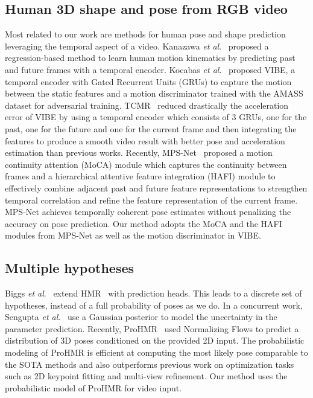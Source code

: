 \documentclass[runningheads]{llncs}
\newcommand{\etal}{\textit{et al}.}
\begin{document}
\subsection{Human 3D shape and pose from RGB video}
Most related to our work are methods for human pose and shape prediction leveraging the temporal aspect of a video. Kanazawa \etal~\cite{humanMotionKanazawa19} proposed a regression-based method to learn human motion kinematics by predicting past and future frames with a temporal encoder.
Kocabas \etal~\cite{kocabas2019vibe} proposed VIBE, a temporal encoder with Gated Recurrent Units (GRUs) to capture the motion between the static features and a motion discriminator trained with the AMASS~\cite{AMASS:ICCV:2019} dataset for adversarial training. TCMR~\cite{choi2020beyond} reduced drastically the acceleration error of VIBE by using a temporal encoder which consists of 3 GRUs,  one for the past, one for the future and one for the current frame and then integrating the features to produce a smooth video result with better pose and acceleration estimation than previous works.
Recently, MPS-Net~\cite{WeiLin2022mpsnet} proposed a motion continuity attention (MoCA) module which captures the continuity between frames and a hierarchical attentive feature integration (HAFI) module to effectively combine adjacent past and future feature representations to strengthen temporal correlation and refine the feature representation of the current frame. MPS-Net achieves temporally coherent pose estimates without penalizing the accuracy on pose prediction. Our method adopts the MoCA and the HAFI modules from MPS-Net as well as the motion discriminator in VIBE.

\subsection{Multiple hypotheses}
Biggs \etal~\cite{biggs2020multibodies} extend HMR~\cite{kanazawaHMR18} with  prediction heads. This leads to a discrete set of hypotheses, instead of a full probability of poses as we do. In a concurrent work, Sengupta \etal~\cite{sengupta2021hierprobhuman} use a Gaussian posterior to model the uncertainty in
the parameter prediction. 
Recently, ProHMR~\cite{kolotouros2021prohmr} used Normalizing Flows
to predict a  distribution of 3D poses conditioned on the provided 2D input. The probabilistic modeling of ProHMR is efficient at computing the most likely pose comparable to the SOTA methods and also outperforms previous work on optimization tasks such as 2D keypoint fitting and multi-view refinement. Our method uses the probabilistic model of ProHMR for video input.
\end{document}
